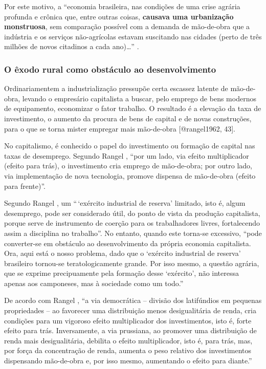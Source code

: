 \documentclass[
	12pt,				%
	oneside,			%
	a4paper,			%
	chapter=TITLE,		%
	section=TITLE,		%
	english,			%
	brazil				%
	]{abntex2}
\begin{document}
Por este motivo, a ``economia brasileira, nas condições de uma crise agrária
profunda e crônica que, entre outras coisas, \textbf{causava uma urbanização
monstruosa}, sem comparação possível com a demanda de mão-de-obra que a
indústria e os serviços não-agrícolas estavam suscitando nas cidades (perto de
três milhões de novos citadinos a cada ano)\ldots{}'' \autocite[134]{rangel1986b}.

\hypertarget{o-uxeaxodo-rural-como-obstuxe1culo-ao-desenvolvimento}{%
\subsubsection{O êxodo rural como obstáculo ao desenvolvimento}\label{o-uxeaxodo-rural-como-obstuxe1culo-ao-desenvolvimento}}
\begin{citacao}
Ordinariamentem a industrialização pressupõe certa escassez latente de 
mão-de-obra, levando o empresário capitalista a buscar, pelo emprego de bens
modernos de equipamento, economizar o fator trabalho. O resultado é a elevação 
da taxa de investimento, o aumento da procura de bens de capital e de novas
construções, para o que se torna mister empregar mais mão-de-obra 
[@rangel1962, 43].
\end{citacao}
No capitalismo, é conhecido o papel do investimento ou formação de capital nas
taxas de desemprego. Segundo Rangel \autocite*[156]{rangel1988}, ``por um lado, via
efeito multiplicador (efeito para trás), o investimento cria emprego de
mão-de-obra; por outro lado, via implementação de nova tecnologia, promove
dispensa de mão-de-obra (efeito para frente)''.

Segundo Rangel \autocite[142]{rangel1986c}, um ``\,`exército industrial de reserva'
limitado, isto é, algum desemprego, pode ser considerado útil, do ponto de vista
da produção capitalista, porque serve de instrumento de coerção para os
trabalhadores livres, fortalecendo assim a disciplina no trabalho''. No entanto,
quando este torna-se excessivo, ``pode converter-se em obstáculo ao
desenvolvimento da própria economia capitalista. Ora, aqui está o nosso
problema, dado que o `exército industrial de reserva' brasileiro tornou-se
teratologicamente grande. Por isso mesmo, a questão agrária, que se exprime
precipuamente pela formação desse `exército', não interessa apenas aos
camponeses, mas à sociedade como um todo.''

De acordo com Rangel \autocite*[156]{rangel1988}, ``a via democrática -- divisão dos
latifúndios em pequenas propriedades -- ao favorecer uma distribuição menos
desigualitária de renda, cria condições para um vigoroso efeito multiplicador
dos investimentos, isto é, forte efeito para trás. Inversamente, a via
prussiana, ao promover uma distribuição de renda mais desigualitária, debilita o
efeito multiplicador, isto é, para trás, mas, por força da concentração de
renda, aumenta o peso relativo dos investimentos dispensando mão-de-obra e, por
isso mesmo, aumentando o efeito para diante.''
\end{document}

